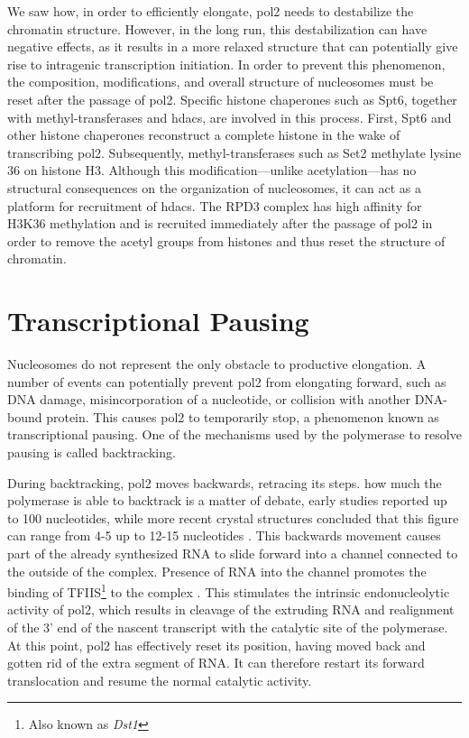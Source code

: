 We saw how, in order to efficiently elongate, \gls{pol2} needs to destabilize the chromatin structure.
However, in the long run, this destabilization can have negative effects, as it results in a more relaxed structure that can potentially give rise to intragenic transcription initiation.
In order to prevent this phenomenon, the composition, modifications, and overall structure of nucleosomes must be reset after the passage of \gls{pol2}. 
Specific histone chaperones such as Spt6, together with methyl-transferases and \gls{hdacs}, are involved in this process.
First, Spt6 and other histone chaperones reconstruct a complete histone in the wake of transcribing \gls{pol2}.
Subsequently, methyl-transferases such as Set2 methylate lysine 36 on histone H3. 
Although this modification---unlike acetylation---has no structural consequences on the organization of nucleosomes, it can act as a platform for recruitment of \gls{hdacs}.
The RPD3 complex has high affinity for H3K36 methylation and is recruited immediately after the passage of \gls{pol2} in order to remove the acetyl groups from histones and thus reset the structure of chromatin.

\section{Transcriptional Pausing} \label{pausing}
Nucleosomes do not represent the only obstacle to productive elongation.
A number of events can potentially prevent \gls{pol2} from elongating forward, such as DNA damage, misincorporation of a nucleotide, or collision with another DNA-bound protein.
This causes \gls{pol2} to temporarily stop, a phenomenon known as transcriptional pausing.
One of the mechanisms used by the polymerase to resolve pausing is called backtracking.

During backtracking, \gls{pol2} moves backwards, retracing its steps.
how much the polymerase is able to backtrack \invivo{} is a matter of debate, early \invitro{} studies reported up to 100 nucleotides, while more recent crystal structures concluded that this figure can range from 4-5 up to 12-15 nucleotides \citep{cheung:2011:structural}.
This backwards movement causes part of the already synthesized RNA to slide forward into a channel connected to the outside of the complex.
Presence of RNA into the channel promotes the binding of TFIIS\footnote{Also known as \emph{Dst1}} to the complex \citep{cheung:2011:structural}.
This stimulates the intrinsic endonucleolytic activity of \gls{pol2}, which results in cleavage of the extruding RNA and realignment of the 3' end of the nascent transcript with the catalytic site of the polymerase.
At this point, \gls{pol2} has effectively reset its position, having moved back and gotten rid of the extra segment of RNA. 
It can therefore restart its forward translocation and resume the normal catalytic activity.

